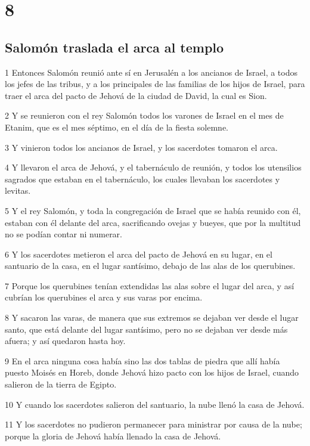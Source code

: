 \chapter{8}

\section*{Salomón traslada el arca al templo}

\par 1 Entonces Salomón reunió ante sí en Jerusalén a los ancianos de Israel, a todos los jefes de las tribus, y a los principales de las familias de los hijos de Israel, para traer el arca del pacto de Jehová de la ciudad de David, la cual es Sion.
\par 2 Y se reunieron con el rey Salomón todos los varones de Israel en el mes de Etanim, que es el mes séptimo, en el día de la fiesta solemne.
\par 3 Y vinieron todos los ancianos de Israel, y los sacerdotes tomaron el arca.
\par 4 Y llevaron el arca de Jehová, y el tabernáculo de reunión, y todos los utensilios sagrados que estaban en el tabernáculo, los cuales llevaban los sacerdotes y levitas.
\par 5 Y el rey Salomón, y toda la congregación de Israel que se había reunido con él, estaban con él delante del arca, sacrificando ovejas y bueyes, que por la multitud no se podían contar ni numerar.
\par 6 Y los sacerdotes metieron el arca del pacto de Jehová en su lugar, en el santuario de la casa, en el lugar santísimo, debajo de las alas de los querubines. 
\par 7 Porque los querubines tenían extendidas las alas sobre el lugar del arca, y así cubrían los querubines el arca y sus varas por encima.
\par 8 Y sacaron las varas, de manera que sus extremos se dejaban ver desde el lugar santo, que está delante del lugar santísimo, pero no se dejaban ver desde más afuera; y así quedaron hasta hoy.
\par 9 En el arca ninguna cosa había sino las dos tablas de piedra que allí había puesto Moisés en Horeb, donde Jehová hizo pacto con los hijos de Israel, cuando salieron de la tierra de Egipto.
\par 10 Y cuando los sacerdotes salieron del santuario, la nube llenó la casa de Jehová.
\par 11 Y los sacerdotes no pudieron permanecer para ministrar por causa de la nube; porque la gloria de Jehová había llenado la casa de Jehová. 

